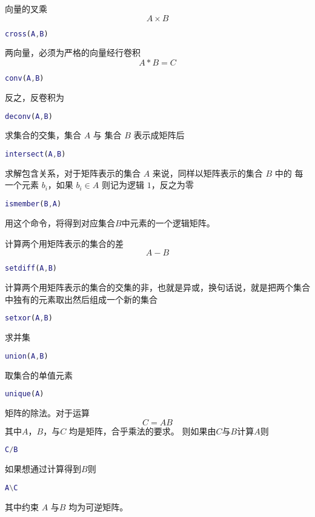 \documentclass{ctexart}
\begin{document}
  向量的叉乘
  $$A \times B$$
  \begin{lstlisting}[language=matlab]
  cross(A,B)
  \end{lstlisting}

  两向量，必须为严格的向量经行卷积
  $$A*B=C$$
  \begin{lstlisting}[language=matlab]
  conv(A,B)
  \end{lstlisting}
  反之，反卷积为
  \begin{lstlisting}[language=matlab]
  deconv(A,B)
  \end{lstlisting}
 
  求集合的交集，集合 $A$ 与 集合 $B$ 表示成矩阵后
  \begin{lstlisting}[language=matlab]
  intersect(A,B)
  \end{lstlisting}
  
  求解包含关系，对于矩阵表示的集合 $A$ 来说，同样以矩阵表示的集合 $B$ 中的
  每一个元素 $b_i$，如果 $b_i \in A$ 则记为逻辑 $1$，反之为零
  \begin{lstlisting}[language=matlab]
  ismember(B,A)
  \end{lstlisting}
  用这个命令，将得到对应集合$B$中元素的一个逻辑矩阵。
  
  计算两个用矩阵表示的集合的差
  $$A-B$$
 \begin{lstlisting}[language=matlab]
 setdiff(A,B)
 \end{lstlisting}
 
 计算两个用矩阵表示的集合的交集的非，也就是异或，换句话说，就是把两个集合中独有的元素取出然后组成一个新的集合
 \begin{lstlisting}[language=matlab]
 setxor(A,B)
 \end{lstlisting}
 
 求并集
 \begin{lstlisting}[language=matlab]
 union(A,B)
 \end{lstlisting}
 
 取集合的单值元素
 \begin{lstlisting}[language=matlab]
 unique(A)
 \end{lstlisting}
 
 矩阵的除法。对于运算
 $$C=AB$$
 其中$A$，$B$，与$C$ 均是矩阵，合乎乘法的要求。
 则如果由$C$与$B$计算$A$则
 \begin{lstlisting}[language=matlab]
 C/B
 \end{lstlisting}
 如果想通过计算得到$B$则
 \begin{lstlisting}[language=matlab]
 A\C
 \end{lstlisting}
 其中约束 $A$ 与$B$ 均为可逆矩阵。
 
\end{document}
